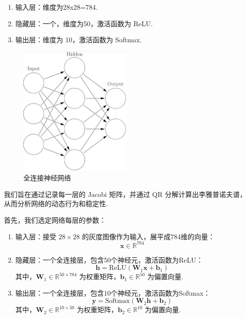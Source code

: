 \begin{enumerate}
  \item 输入层：维度为28x28=784. 
  \item 隐藏层：一个，维度为50，激活函数为 ReLU. 
  \item 输出层：维度为 10，激活函数为 Softmax. 
\end{enumerate}

\begin{figure}[htbp]
   \centering
   \includegraphics[width=0.5\textwidth]{figures/nn.jpeg}
   \caption{全连接神经网络}
   \label{fig:example}
 \end{figure}

我们旨在通过记录每一层的 Jacobi 矩阵，并通过 QR 分解计算出李雅普诺夫谱，从而分析网络的动态行为和稳定性. 

首先，我们选定网络每层的参数：

\begin{enumerate}
   \item 输入层：接受 $28\times28$ 的灰度图像作为输入，展平成784维的向量：
   \[
   \mathbf{x} \in \mathbb{R}^{784}
   \]

\item 隐藏层：一个全连接层，包含50个神经元，激活函数为ReLU：
   \[
   \mathbf{h} = \text{ReLU}(\mathbf{W}_1 \mathbf{x} + \mathbf{b}_1)
   \]
   其中，\(\mathbf{W}_1 \in \mathbb{R}^{50 \times 784}\) 为权重矩阵，\(\mathbf{b}_1 \in \mathbb{R}^{50}\) 为偏置向量. 

\item 输出层：一个全连接层，包含10个神经元，激活函数为Softmax：
   \[
   \mathbf{y} = \text{Softmax}(\mathbf{W}_2 \mathbf{h} + \mathbf{b}_2)
   \]
   其中，\(\mathbf{W}_2 \in \mathbb{R}^{10 \times 50}\) 为权重矩阵，\(\mathbf{b}_2 \in \mathbb{R}^{10}\) 为偏置向量. 
\end{enumerate}

